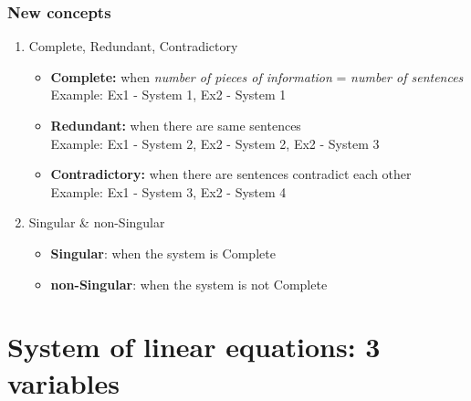 \documentclass[12pt,a4paper]{article}
\begin{document}
\subsubsection{New concepts}
\begin{enumerate}
    \item Complete, Redundant, Contradictory
    \begin{itemize}
        \item \textbf{Complete:} when \textit{number of pieces of information} = \textit{number of sentences}\\Example: Ex1 - System 1, Ex2 - System 1
        \item \textbf{Redundant:} when there are same sentences\\Example: Ex1 - System 2, Ex2 - System 2, Ex2 - System 3
        \item \textbf{Contradictory:} when there are sentences contradict each other\\Example: Ex1 - System 3, Ex2 - System 4
    \end{itemize}
    \item Singular \& non-Singular
    \begin{itemize}
        \item \textbf{Singular}: when the system is Complete
        \item \textbf{non-Singular}: when the system is not Complete
    \end{itemize}
\end{enumerate}

\section{System of linear equations: 3 variables}
\end{document}
